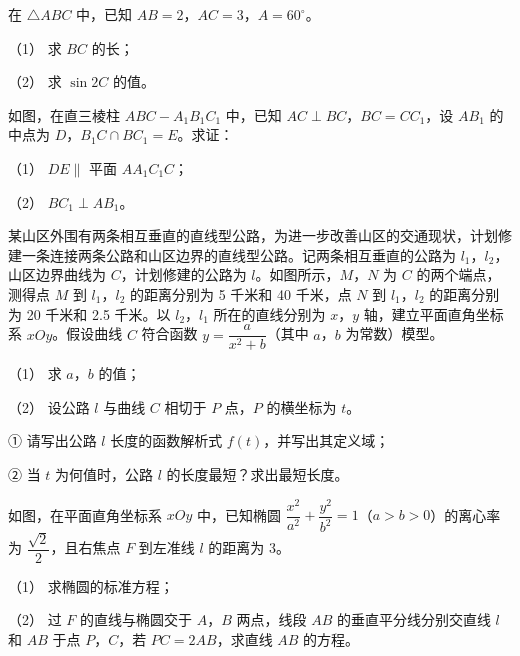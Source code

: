 \begin{question}
在 \(\triangle ABC\) 中，已知 \(AB=2\)，\(AC=3\)，\(A=60^{\circ}\)。

（1） 求 \(BC\) 的长；

（2） 求 \(\sin 2C\) 的值。

\Needspace{0.4\textheight}
\end{question}
\begin{question}
如图，在直三棱柱 \(ABC-A_{1}B_{1}C_{1}\) 中，已知 \(AC\perp BC\)，\(BC=CC_{1}\)，设 \(AB_{1}\) 的中点为 \(D\)，\(B_{1}C\cap BC_{1}=E\)。求证：

（1） \(DE\parallel\) 平面 \(AA_{1}C_{1}C\)；

（2） \(BC_{1}\perp AB_{1}\)。
\nopagebreak[4]
\begin{center}\end{center}
\nopagebreak[4]
\Needspace{0.4\textheight}
\end{question}
\begin{question}
某山区外围有两条相互垂直的直线型公路，为进一步改善山区的交通现状，计划修建一条连接两条公路和山区边界的直线型公路。记两条相互垂直的公路为 \(l_{1}\)，\(l_{2}\)，山区边界曲线为 \(C\)，计划修建的公路为 \(l\)。如图所示，\(M\)，\(N\) 为 \(C\) 的两个端点，测得点 \(M\) 到 \(l_{1}\)，\(l_{2}\) 的距离分别为 5 千米和 40 千米，点 \(N\) 到 \(l_{1}\)，\(l_{2}\) 的距离分别为 20 千米和 2.5 千米。以 \(l_{2}\)，\(l_{1}\) 所在的直线分别为 \(x\)，\(y\) 轴，建立平面直角坐标系 \(xOy\)。假设曲线 \(C\) 符合函数 \(y=\dfrac{a}{x^{2}+b}\)（其中 \(a\)，\(b\) 为常数）模型。

（1） 求 \(a\)，\(b\) 的值；

（2） 设公路 \(l\) 与曲线 \(C\) 相切于 \(P\) 点，\(P\) 的横坐标为 \(t\)。

① 请写出公路 \(l\) 长度的函数解析式 \(f(t)\)，并写出其定义域；

② 当 \(t\) 为何值时，公路 \(l\) 的长度最短？求出最短长度。
\nopagebreak[4]
\begin{center}\end{center}
\nopagebreak[4]
\Needspace{0.4\textheight}
\end{question}
\begin{question}
如图，在平面直角坐标系 \(xOy\) 中，已知椭圆 \(\dfrac{x^{2}}{a^{2}}+\dfrac{y^{2}}{b^{2}}=1\)（\(a>b>0\)）的离心率为 \(\dfrac{\sqrt{2}}{2}\)，且右焦点 \(F\) 到左准线 \(l\) 的距离为 3。

（1） 求椭圆的标准方程；

（2） 过 \(F\) 的直线与椭圆交于 \(A\)，\(B\) 两点，线段 \(AB\) 的垂直平分线分别交直线 \(l\) 和 \(AB\) 于点 \(P\)，\(C\)，若 \(PC=2AB\)，求直线 \(AB\) 的方程。
\nopagebreak[4]
\begin{center}\end{center}
\nopagebreak[4]
\end{question}
